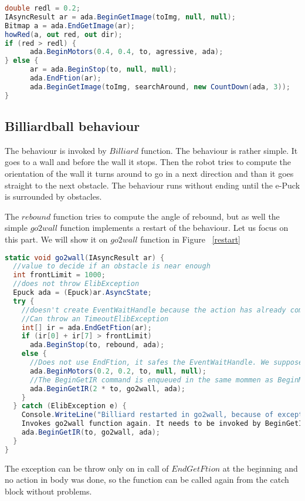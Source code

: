 \begin{lstlisting}[language=cs]
double redl = 0.2;
IAsyncResult ar = ada.BeginGetImage(toImg, null, null);
Bitmap a = ada.EndGetImage(ar);
howRed(a, out red, out dir);
if (red > redl) {
      ada.BeginMotors(0.4, 0.4, to, agressive, ada);
} else {
      ar = ada.BeginStop(to, null, null);
      ada.EndFtion(ar);
      ada.BeginGetImage(toImg, searchAround, new CountDown(ada, 3));
}
\end{lstlisting}
	
\subsection{Billiardball behaviour}\label{billiard}
	The behaviour is invoked by $Billiard$ function. The behaviour is rather simple.
	It goes to a wall and before the wall it stops. Then the robot tries to compute the
	orientation of the wall it turns around to go in a next direction and than it goes straight
	to the next obstacle.
	The behaviour runs without ending until the e-Puck is surrounded by obstacles.

	The $rebound$ function tries to compute the angle of rebound, but as well the simple $go2wall$ function
	implements a restart of the behaviour.
	Let us focus on this part. We will show it on $go2wall$ function in Figure ~\ref{restart}

\begin{lstlisting}[language=cs]
static void go2wall(IAsyncResult ar) {
  //value to decide if an obstacle is near enough
  int frontLimit = 1000;  
  //does not throw ElibException
  Epuck ada = (Epuck)ar.AsyncState;
  try {
    //doesn't create EventWaitHandle because the action has already completed synchronously.
    //Can throw an TimeoutElibException
    int[] ir = ada.EndGetFtion(ar);    
    if (ir[0] + ir[7] > frontLimit)
      ada.BeginStop(to, rebound, ada);
    else {
      //Does not use EndFtion, it safes the EventWaitHandle. We suppose, that it succeeds now or in next rounds.
      ada.BeginMotors(0.2, 0.2, to, null, null);
      //The BeginGetIR command is enqueued in the same mommen as BeginMotors, therefor 2*to.
      ada.BeginGetIR(2 * to, go2wall, ada);
    }
  } catch (ElibException e) {
    Console.WriteLine("Billiard restarted in go2wall, because of exception:\n" + e.Message);
    Invokes go2wall function again. It needs to be invoked by BeginGetIR command, because it expects ar with IR values.
    ada.BeginGetIR(to, go2wall, ada);
  }
}
\end{lstlisting}
	The exception can be throw only on in call of $EndGetFtion$ at the beginning and 
	no action in body was done, so the function can be called again from the catch block without problems.

